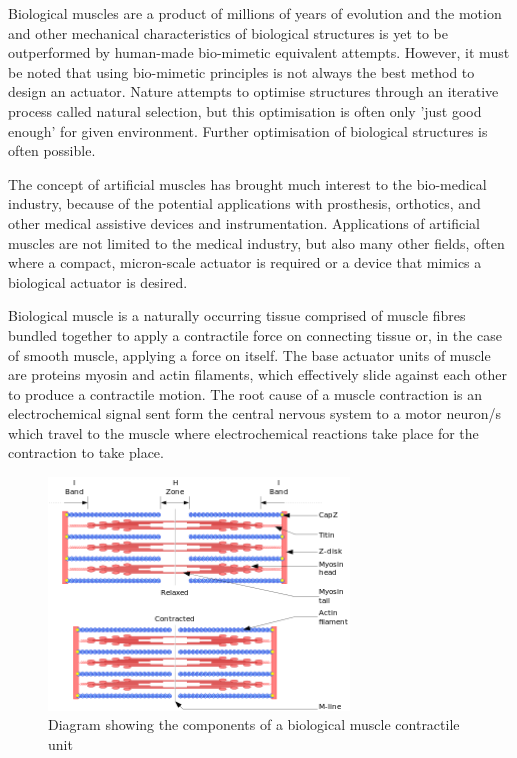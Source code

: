Biological muscles are a product of millions of years of evolution and the motion and other mechanical characteristics of biological structures is yet to be outperformed by human-made bio-mimetic equivalent attempts. However, it must be noted that using bio-mimetic principles is not always the best method to design an actuator. Nature attempts to optimise structures through an iterative process called natural selection, but this optimisation is often only 'just good enough' for given environment\citep{Full2004a}. Further optimisation of biological structures is often possible.

The concept of artificial muscles has brought much interest to the bio-medical industry, because of the potential applications with prosthesis, orthotics, and other medical assistive devices and instrumentation\citep{Shi2019,Mirvakili2018}. Applications of artificial muscles are not limited to the medical industry, but also many other fields, often where a compact, micron-scale actuator is required\citep{Zhang2019} or a device that mimics a biological actuator is desired.

Biological muscle is a naturally occurring tissue comprised of muscle fibres bundled together to apply a contractile force on connecting tissue or, in the case of smooth muscle, applying a force on itself. The base actuator units of muscle are proteins myosin and actin filaments, which effectively slide against each other to produce a contractile motion. The root cause of a muscle contraction is an electrochemical signal sent form the central nervous system to a motor neuron/s which travel to the muscle where electrochemical reactions take place for the contraction to take place.

\begin{figure}[h!]
  \centering
  \includegraphics[width=8cm]{Figures/300px-Sarcomere.png}
  \caption{Diagram showing the components of a biological muscle contractile unit \citep{Richfield2014}}
  \label{fig:muscle_unit}
\end{figure}

